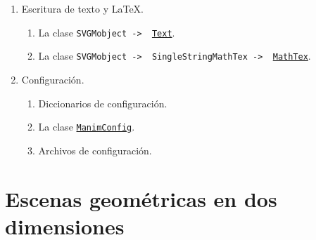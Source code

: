 \documentclass[a4paper]{article}
\begin{document}
\begin{enumerate}
    \item Escritura de texto y \LaTeX.
    \begin{enumerate}[label=4.\arabic*]

        \item La clase \texttt{SVGMobject -> \ \href{https://docs.manim.community/en/v0.16.0.post0/reference/manim.mobject.text.text_mobject.Text.html?highlight=Text}{Text}}.

        \item La clase \texttt{SVGMobject -> \ SingleStringMathTex -> \ \href{https://docs.manim.community/en/v0.16.0.post0/reference/manim.mobject.text.tex_mobject.MathTex.html?highlight=MathTex}{MathTex}}.
    \end{enumerate}

    \item Configuración.
    \begin{enumerate}[label=5.\arabic*]

        \item Diccionarios de configuración.

        \item La clase \href{https://docs.manim.community/en/v0.16.0.post0/reference/manim._config.utils.ManimConfig.html?highlight=ManimConfig}{\texttt{ManimConfig}}.

        \item Archivos de configuración.
    \end{enumerate}

\end{enumerate}

\section{Escenas geométricas en dos dimensiones} \label{Sec: Escenas geométricas en dos dimensiones}
\end{document}

